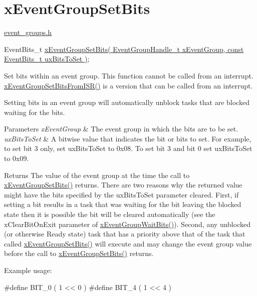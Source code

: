 \hypertarget{group__xEventGroupSetBits}{\section{x\-Event\-Group\-Set\-Bits}
\label{group__xEventGroupSetBits}
}
\hyperlink{event__groups_8h}{event\-\_\-groups.\-h} 
\begin{DoxyPre}
    EventBits\_t \hyperlink{event__groups_8h_a02d7b3bb55f7e11d9c47116266c5fb2e}{xEventGroupSetBits( EventGroupHandle\_t xEventGroup, const EventBits\_t uxBitsToSet )};
 \end{DoxyPre}


Set bits within an event group. This function cannot be called from an interrupt. \hyperlink{event__groups_8h_a62b68278abac6358369ae8e390988a02}{x\-Event\-Group\-Set\-Bits\-From\-I\-S\-R()} is a version that can be called from an interrupt.

Setting bits in an event group will automatically unblock tasks that are blocked waiting for the bits.


\begin{DoxyParams}{Parameters}
{\em x\-Event\-Group} & The event group in which the bits are to be set.\\
\hline
{\em ux\-Bits\-To\-Set} & A bitwise value that indicates the bit or bits to set. For example, to set bit 3 only, set ux\-Bits\-To\-Set to 0x08. To set bit 3 and bit 0 set ux\-Bits\-To\-Set to 0x09.\\
\hline
\end{DoxyParams}
\begin{DoxyReturn}{Returns}
The value of the event group at the time the call to \hyperlink{event__groups_8h_a02d7b3bb55f7e11d9c47116266c5fb2e}{x\-Event\-Group\-Set\-Bits()} returns. There are two reasons why the returned value might have the bits specified by the ux\-Bits\-To\-Set parameter cleared. First, if setting a bit results in a task that was waiting for the bit leaving the blocked state then it is possible the bit will be cleared automatically (see the x\-Clear\-Bit\-On\-Exit parameter of \hyperlink{event__groups_8h_aab9d5b405bc57b7624dcabe9a9a503db}{x\-Event\-Group\-Wait\-Bits()}). Second, any unblocked (or otherwise Ready state) task that has a priority above that of the task that called \hyperlink{event__groups_8h_a02d7b3bb55f7e11d9c47116266c5fb2e}{x\-Event\-Group\-Set\-Bits()} will execute and may change the event group value before the call to \hyperlink{event__groups_8h_a02d7b3bb55f7e11d9c47116266c5fb2e}{x\-Event\-Group\-Set\-Bits()} returns.
\end{DoxyReturn}
Example usage\-: 
\begin{DoxyPre}
   #define BIT\_0    ( 1 << 0 )
   #define BIT\_4    ( 1 << 4 )\end{DoxyPre}



